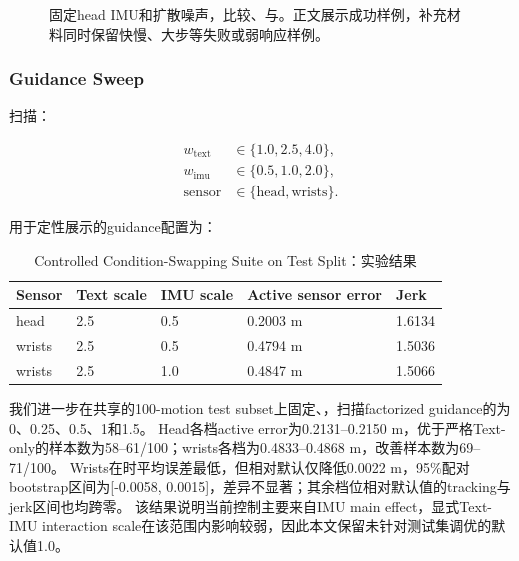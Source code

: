 \begin{figure}[t]
\centering
{}
\caption{固定head IMU和扩散噪声，比较\texttt{\protect{}}、\texttt{\protect{}}与\texttt{\protect{}}。正文展示成功样例，补充材料同时保留快慢、大步等失败或弱响应样例。}
\label{fig:qualitative-2}
\end{figure}

\subsubsection{Guidance Sweep}

扫描：

\[\begin{aligned}w_{\mathrm{text}}&\in\{1.0,2.5,4.0\},\\w_{\mathrm{imu}}&\in\{0.5,1.0,2.0\},\\\mathrm{sensor}&\in\{\mathrm{head},\mathrm{wrists}\}.\end{aligned}\]

用于定性展示的guidance配置为：

\begin{table}[t]
\centering
\caption{Controlled Condition-Swapping Suite on Test Split：实验结果}
\label{tab:result-15}
\footnotesize
\setlength{\tabcolsep}{3pt}
\renewcommand{\arraystretch}{1.15}
\begin{tabularx}{\linewidth}{LLLLL}
\toprule
Sensor & Text scale & IMU scale & Active sensor error & Jerk \\
\midrule
head & 2.5 & 0.5 & 0.2003 m & 1.6134 \\
wrists & 2.5 & 0.5 & 0.4794 m & 1.5036 \\
wrists & 2.5 & 1.0 & 0.4847 m & 1.5066 \\
\bottomrule
\end{tabularx}
\end{table}


我们进一步在共享的100-motion test subset上固定\texttt{}、\texttt{}，扫描factorized guidance的\texttt{}为0、0.25、0.5、1和1.5。
Head各档active error为0.2131--0.2150 m，优于严格Text-only的样本数为58--61/100；wrists各档为0.4833--0.4868 m，改善样本数为69--71/100。
Wrists在\texttt{}时平均误差最低，但相对默认\texttt{}仅降低0.0022 m，95\%配对bootstrap区间为[-0.0058, 0.0015]，差异不显著；其余档位相对默认值的tracking与jerk区间也均跨零。
该结果说明当前控制主要来自IMU main effect，显式Text-IMU interaction scale在该范围内影响较弱，因此本文保留未针对测试集调优的默认值1.0。

